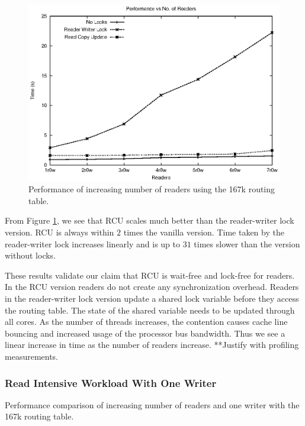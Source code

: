 \documentclass{article}
\begin{document}
\begin{figure}[tph]
\includegraphics[scale = 0.6]{../images/graphs/macro_vr_0w.eps}
\caption{Performance of increasing number of readers using the 167k routing table.}
\label{img:macro_vr_0w}
\end{figure}

From Figure \ref{img:macro_vr_0w}, we see that RCU scales much better
than the reader-writer lock version. RCU is always within $2$ times
the vanilla version. Time taken by the reader-writer lock increases
linearly and is up to $31$ times slower than the version without
locks.

These results validate our claim that RCU is wait-free and lock-free
for readers. In the RCU version readers do not create any
synchronization overhead. Readers in the reader-writer lock version
update a shared lock variable before they access the routing
table. The state of the shared variable needs to be updated through
all cores. As the number of threads increases, the contention causes
cache line bouncing and increased usage of the processor bus
bandwidth. Thus we see a linear increase in time as the number of
readers increase. **Justify with profiling measurements.

\subsubsection{Read Intensive Workload With One Writer}
\begin{table}[tph]
\begin{center}

\end{center}
\caption{Performance comparison of increasing number of readers and one writer with the 167k routing table.}
\label{tbl:macro_vr_1w}
\end{table}
\end{document}
